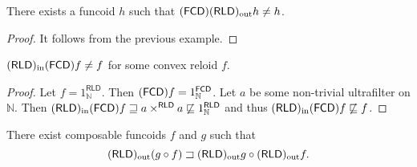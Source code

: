 \begin{example}
There exists a funcoid $h$ such that $(\mathsf{FCD})(\mathsf{RLD})_{\mathrm{out}} h\ne h$.\end{example}
\begin{proof}
It follows from the previous example.\end{proof}
\begin{example}
$(\mathsf{RLD})_{\mathrm{in}}(\mathsf{FCD}) f\ne f$ for some convex reloid $f$.\end{example}
\begin{proof}
Let $f=1_{\mathbb{N}}^{\mathsf{RLD}}$. Then $(\mathsf{FCD}) f=1_{\mathbb{N}}^{\mathsf{FCD}}$.
Let $a$ be some non-trivial ultrafilter on $\mathbb{N}$. Then $(\mathsf{RLD})_{\mathrm{in}}(\mathsf{FCD}) f\sqsupseteq a\times^{\mathsf{RLD}}a\not\sqsubseteq1_{\mathbb{N}}^{\mathsf{RLD}}$
and thus $(\mathsf{RLD})_{\mathrm{in}}(\mathsf{FCD}) f\not\sqsubseteq f$.\end{proof}
\begin{example}
There exist composable funcoids $f$ and $g$ such that
\[
(\mathsf{RLD})_{\mathrm{out}}(g\circ f)\sqsupset(\mathsf{RLD})_{\mathrm{out}} g\circ(\mathsf{RLD})_{\mathrm{out}} f.
\]
\end{example}
